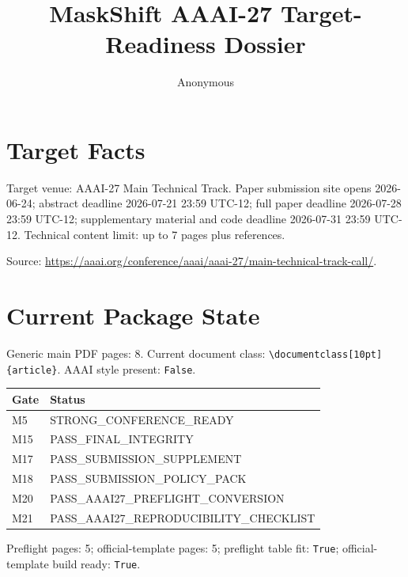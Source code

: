 \documentclass[10pt]{article}
\title{MaskShift AAAI-27 Target-Readiness Dossier}
\author{Anonymous}
\date{}
\begin{document}
\maketitle

\section{Target Facts}
Target venue: AAAI-27 Main Technical Track. Paper submission site opens 2026-06-24; abstract deadline 2026-07-21 23:59 UTC-12; full paper deadline 2026-07-28 23:59 UTC-12; supplementary material and code deadline 2026-07-31 23:59 UTC-12. Technical content limit: up to 7 pages plus references.

Source: \url{https://aaai.org/conference/aaai/aaai-27/main-technical-track-call/}.

\section{Current Package State}
Generic main PDF pages: 8. Current document class: \texttt{\textbackslash{}documentclass[10pt]\{article\}}. AAAI style present: \texttt{False}.

\begin{center}
\begin{tabular}{ll}
\toprule
Gate & Status\\
\midrule
M5 & STRONG\_CONFERENCE\_READY\\
M15 & PASS\_FINAL\_INTEGRITY\\
M17 & PASS\_SUBMISSION\_SUPPLEMENT\\
M18 & PASS\_SUBMISSION\_POLICY\_PACK\\
M20 & PASS\_AAAI27\_PREFLIGHT\_CONVERSION\\
M21 & PASS\_AAAI27\_REPRODUCIBILITY\_CHECKLIST\\
\bottomrule
\end{tabular}
\end{center}

Preflight pages: 5; official-template pages: 5; preflight table fit: \texttt{True}; official-template build ready: \texttt{True}.
\end{document}
